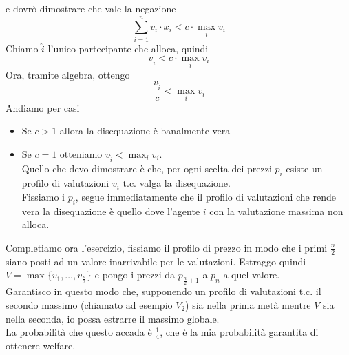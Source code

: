 \documentclass{article}
\begin{document}
            e dovrò dimostrare che vale la negazione
            \[
                \sum_{i = 1}^{n} v_i \cdot x_i < c \cdot \max_i v_i 
            \]
            Chiamo $ \hat{i} $ l'unico partecipante che alloca, quindi
            \[
                v_{\hat{i}} < c \cdot \max_i v_i
            \]
            Ora, tramite algebra, ottengo
            \[
                \frac{v_{\hat{i}}}{c} < \max_i v_i   
            \]
            Andiamo per casi
            \begin{itemize}
                \item Se $ c > 1 $ allora la disequazione è banalmente vera
                \item Se $ c = 1 $ otteniamo $ v_{\hat{i}} < \max_i v_i $.\\
                      Quello che devo dimostrare è che, per ogni scelta dei prezzi $ p_i $ esiste un profilo di valutazioni $ v_i $ t.c. valga la disequazione.\\
                      Fissiamo i $ p_i $, segue immediatamente che il profilo di valutazioni che rende vera la disequazione è quello dove l'agente $ i $ con la valutazione massima non alloca.    
            \end{itemize}
            Completiamo ora l'esercizio, fissiamo il profilo di prezzo in modo che i primi $ \frac{n}{2} $ siano posti ad un valore inarrivabile per le valutazioni. Estraggo quindi $ V = \max\{v_1, \dots, v_{\frac{n}{2}}\} $ e pongo i prezzi da $ p_{\frac{n}{2} + 1} $ a $ p_n $ a quel valore.\\
            Garantisco in questo modo che, supponendo un profilo di valutazioni t.c. il secondo massimo (chiamato ad esempio $ V_2 $) sia nella prima metà mentre $ V $ sia nella seconda, io possa estrarre il massimo globale.\\
            La probabilità che questo accada è $ \frac{1}{4} $, che è la mia probabilità garantita di ottenere welfare.
        \newpage
\end{document}
